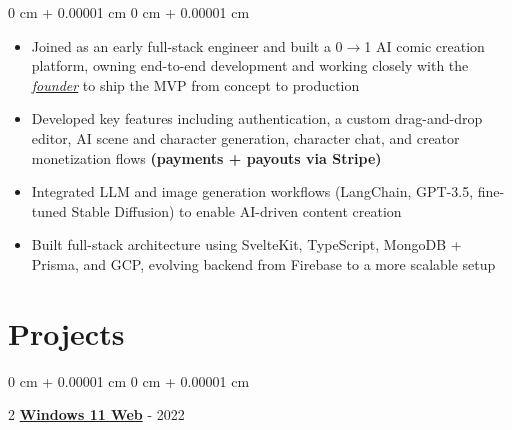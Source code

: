 \documentclass[10pt, a4paper]{article}
\newenvironment{highlights}{ \begin{itemize}[ topsep=0.10 cm, parsep=0.10 cm, partopsep=0pt,
itemsep=0pt, leftmargin=0 cm + 10pt ] }{ \end{itemize} } %
\newenvironment{onecolentry}{ \begin{adjustwidth}{ 0 cm + 0.00001 cm }{ 0 cm + 0.00001 cm }
}{ \end{adjustwidth} } %
\newenvironment{twocolentry}[2][]{ \onecolentry \def\secondColumn{#2} \setcolumnwidth{\fill, 4.5 cm}
\begin{paracol}{2} }{ \switchcolumn \raggedleft \secondColumn \end{paracol}
\endonecolentry } %
\begin{document}
	\vspace{0.1 cm}

	\begin{onecolentry}
		\begin{highlights}
			\item Joined as an early full-stack engineer and built a 0$\rightarrow$1 AI
			comic creation platform, owning end-to-end development and working closely
			with the
			\href{https://yashash.com/testimonials?highlight=will-yoo}{\underline{\textit{founder}}}
			to ship the MVP from concept to production

			\item Developed key features including authentication, a custom drag-and-drop
			editor, AI scene and character generation, character chat, and creator monetization
			flows \textbf{(payments + payouts via Stripe)}

			\item Integrated LLM and image generation workflows (LangChain, GPT-3.5,
			fine-tuned Stable Diffusion) to enable AI-driven content creation

			\item Built full-stack architecture using SvelteKit, TypeScript, MongoDB +
			Prisma, and GCP, evolving backend from Firebase to a more scalable setup
		\end{highlights}
	\end{onecolentry}

	\section{Projects}

	\begin{twocolentry}
		{2021 - 2022} \href{https://win11.yashash.com/}{\textbf{Windows 11
		Web}}
	\end{twocolentry}

	\vspace{0.10 cm}
\end{document}
